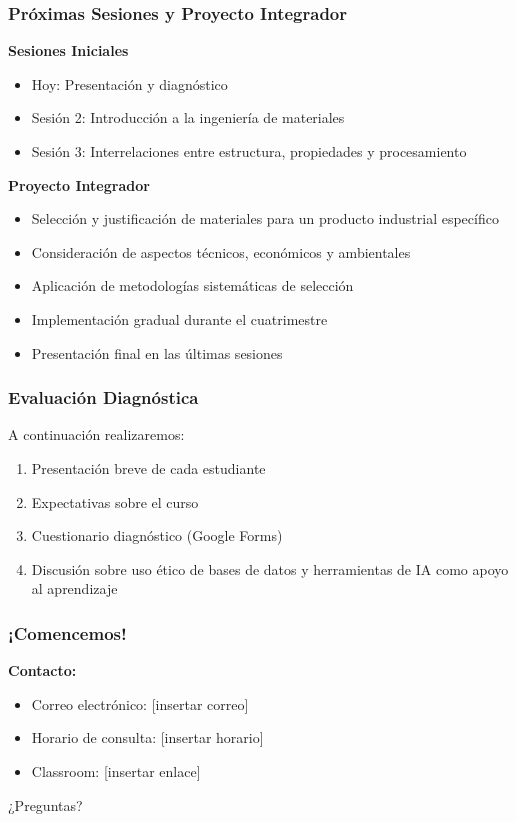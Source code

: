 \documentclass{beamer}
\begin{document}
\begin{frame}
    \frametitle{Próximas Sesiones y Proyecto Integrador}
    
    \textbf{Sesiones Iniciales}
    \begin{itemize}
        \item Hoy: Presentación y diagnóstico
        \item Sesión 2: Introducción a la ingeniería de materiales
        \item Sesión 3: Interrelaciones entre estructura, propiedades y procesamiento
    \end{itemize}
    \vspace{0.2cm}
    
    \textbf{Proyecto Integrador}
    \begin{itemize}
        \item Selección y justificación de materiales para un producto industrial específico
        \item Consideración de aspectos técnicos, económicos y ambientales
        \item Aplicación de metodologías sistemáticas de selección
        \item Implementación gradual durante el cuatrimestre
        \item Presentación final en las últimas sesiones
    \end{itemize}
\end{frame}

\begin{frame}
    \frametitle{Evaluación Diagnóstica}
    
    A continuación realizaremos:
    \begin{enumerate}
        \item Presentación breve de cada estudiante
        \item Expectativas sobre el curso
        \item Cuestionario diagnóstico (Google Forms)
        \item Discusión sobre uso ético de bases de datos y herramientas de IA como apoyo al aprendizaje
    \end{enumerate}
\end{frame}

\begin{frame}
    \frametitle{¡Comencemos!}
    
    \textbf{Contacto:}
    \begin{itemize}
        \item Correo electrónico: [insertar correo]
        \item Horario de consulta: [insertar horario]
        \item Classroom: [insertar enlace]
    \end{itemize}
    \vspace{0.8cm}
    
    \begin{center}
        \Large ¿Preguntas?
    \end{center}
\end{frame}
\end{document}

